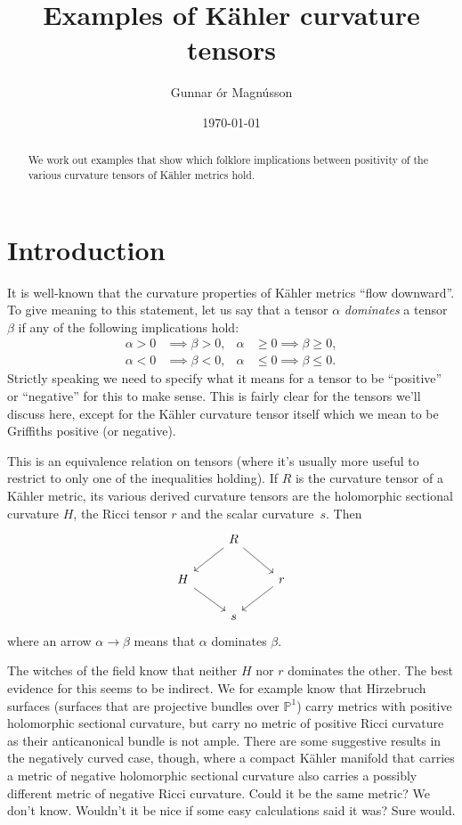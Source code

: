 \documentclass[10pt,a4paper]{amsart}
\author{Gunnar \TH\'or Magn\'usson}
\date{\today}
\title{Examples of K\"ahler curvature tensors}
\theoremstyle{definition}
\newcommand{\kk}[1]{\mathbb{#1}}
\begin{document}
\begin{abstract}
We work out examples that show which folklore implications between
positivity of the various curvature tensors of K\"ahler metrics hold.
\end{abstract}

\maketitle

\section{Introduction}

It is well-known that the curvature properties of K\"ahler metrics ``flow
downward''.
To give meaning to this statement,
let us say that a tensor $\alpha$ \emph{dominates} a tensor $\beta$
if any of the following implications hold:
\begin{align*}
\alpha > 0 &\implies \beta > 0,
&
\alpha &\geq 0 \implies \beta \geq 0,
\\
\alpha < 0 &\implies \beta < 0,
&
\alpha &\leq 0 \implies \beta \leq 0.
\end{align*}
Strictly speaking we need to specify what it means for a tensor to be
``positive'' or ``negative'' for this to make sense.
This is fairly clear for the tensors we'll discuss here, except for the
K\"ahler curvature tensor itself which we mean to be Griffiths positive (or
negative).

This is an equivalence relation on tensors (where it's usually more useful to
restrict to only one of the inequalities holding).
If $R$ is the curvature tensor of a K\"ahler metric, its various derived
curvature tensors are the holomorphic sectional curvature $H$, the Ricci
tensor $r$ and the scalar curvature~$s$.
Then
$$
\begin{tikzcd}
& R \ar[dl] \ar[dr] &
\\
H \ar[dr] & & r \ar[dl]
\\
& s &
\end{tikzcd}
$$
where an arrow $\alpha \to \beta$ means that $\alpha$ dominates $\beta$.

The witches of the field know that neither $H$ nor $r$ dominates the other.
The best evidence for this seems to be indirect.
We for example know that Hirzebruch surfaces (surfaces that are projective
bundles over $\kk P^1$) carry metrics with positive holomorphic sectional
curvature, but carry no metric of positive Ricci curvature as their anticanonical
bundle is not ample.
There are some suggestive results in the negatively curved case, though,
where a compact K\"ahler manifold that carries a metric of negative holomorphic
sectional curvature also carries a possibly different metric of negative Ricci
curvature.
Could it be the same metric?
We don't know.
Wouldn't it be nice if some easy calculations said it was?
Sure would.
\end{document}
